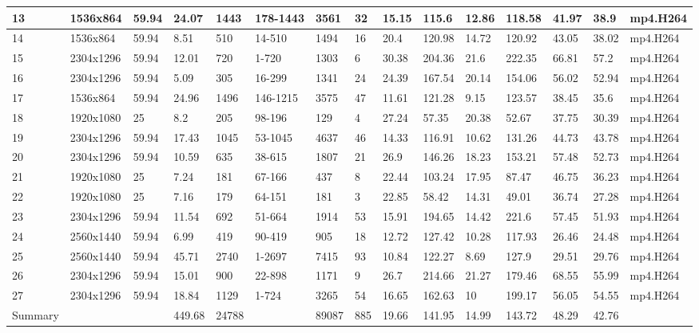 \begin{landscape}
\begin{table}[H]
\begin{tabular}{|l|l|l|l|l|l|l|l|l|l|l|l|l|l|l|}
        13 & 1536x864 & 59.94 & 24.07 & 1443 & 178-1443 & 3561 & 32 & 15.15 & 115.6 & 12.86 & 118.58 & 41.97 & 38.9 & mp4.H264  \\ \hline
        14 & 1536x864 & 59.94 & 8.51 & 510 & 14-510 & 1494 & 16 & 20.4 & 120.98 & 14.72 & 120.92 & 43.05 & 38.02 & mp4.H264  \\ \hline
        15 & 2304x1296 & 59.94 & 12.01 & 720 & 1-720 & 1303 & 6 & 30.38 & 204.36 & 21.6 & 222.35 & 66.81 & 57.2 & mp4.H264  \\ \hline
        16 & 2304x1296 & 59.94 & 5.09 & 305 & 16-299 & 1341 & 24 & 24.39 & 167.54 & 20.14 & 154.06 & 56.02 & 52.94 & mp4.H264  \\ \hline
        17 & 1536x864 & 59.94 & 24.96 & 1496 & 146-1215 & 3575 & 47 & 11.61 & 121.28 & 9.15 & 123.57 & 38.45 & 35.6 & mp4.H264  \\ \hline
        18 & 1920x1080 & 25 & 8.2 & 205 & 98-196 & 129 & 4 & 27.24 & 57.35 & 20.38 & 52.67 & 37.75 & 30.39 & mp4.H264  \\ \hline
        19 & 2304x1296 & 59.94 & 17.43 & 1045 & 53-1045 & 4637 & 46 & 14.33 & 116.91 & 10.62 & 131.26 & 44.73 & 43.78 & mp4.H264  \\ \hline
        20 & 2304x1296 & 59.94 & 10.59 & 635 & 38-615 & 1807 & 21 & 26.9 & 146.26 & 18.23 & 153.21 & 57.48 & 52.73 & mp4.H264  \\ \hline
        21 & 1920x1080 & 25 & 7.24 & 181 & 67-166 & 437 & 8 & 22.44 & 103.24 & 17.95 & 87.47 & 46.75 & 36.23 & mp4.H264  \\ \hline
        22 & 1920x1080 & 25 & 7.16 & 179 & 64-151 & 181 & 3 & 22.85 & 58.42 & 14.31 & 49.01 & 36.74 & 27.28 & mp4.H264  \\ \hline
        23 & 2304x1296 & 59.94 & 11.54 & 692 & 51-664 & 1914 & 53 & 15.91 & 194.65 & 14.42 & 221.6 & 57.45 & 51.93 & mp4.H264  \\ \hline
        24 & 2560x1440 & 59.94 & 6.99 & 419 & 90-419 & 905 & 18 & 12.72 & 127.42 & 10.28 & 117.93 & 26.46 & 24.48 & mp4.H264  \\ \hline
        25 & 2560x1440 & 59.94 & 45.71 & 2740 & 1-2697 & 7415 & 93 & 10.84 & 122.27 & 8.69 & 127.9 & 29.51 & 29.76 & mp4.H264  \\ \hline
        26 & 2304x1296 & 59.94 & 15.01 & 900 & 22-898 & 1171 & 9 & 26.7 & 214.66 & 21.27 & 179.46 & 68.55 & 55.99 & mp4.H264  \\ \hline
        27 & 2304x1296 & 59.94 & 18.84 & 1129 & 1-724 & 3265 & 54 & 16.65 & 162.63 & 10 & 199.17 & 56.05 & 54.55 & mp4.H264  \\ \hline
        Summary & ~ & ~ & 449.68 & 24788 & ~ & 89087 & 885 & 19.66 & 141.95 & 14.99 & 143.72 & 48.29 & 42.76 & ~ \\ \hline
    \end{tabular}
\end{table}
\end{landscape}


